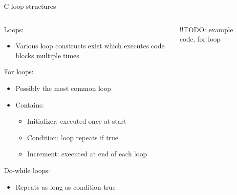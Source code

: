\documentclass{beamer}
\begin{document}
\begin{frame}{C loop structures}
  \begin{columns}[T]
    \begin{column}{.6\textwidth}
      Loops:
      \begin{itemize}
        \item Various loop constructs exist which executes code blocks multiple times
      \end{itemize}  
      For loops:
      \begin{itemize}
        \item Possibly the most common loop
        \item Contains:
        \begin{itemize}
          \item Initializer: executed once at start
          \item Condition: loop repeats if true
          \item Increment: executed at end of each loop
        \end{itemize}
      \end{itemize}
      Do-while loops:      
      \begin{itemize}
        \item Repeats as long as condition true
      \end{itemize}
    \end{column}

    \begin{column}{0.4\textwidth}
      !!TODO: example code, for loop
    \end{column}
  \end{columns}
\end{frame}

\end{document}
